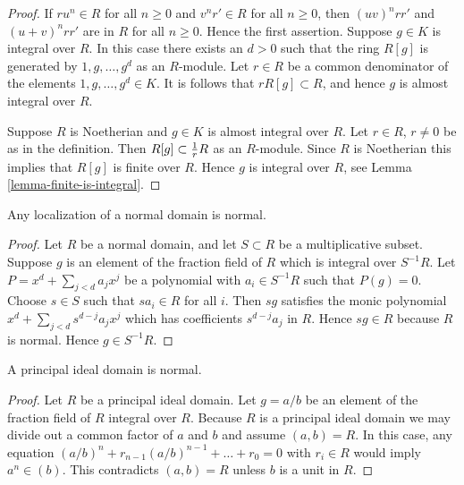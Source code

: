 \begin{proof}
If $ru^n \in R$ for all $n \geq 0$ and 
$v^nr' \in R$ for all $n \geq 0$, then
$(uv)^nrr'$ and $(u+v)^nrr'$ are in $R$ for
all $n \geq 0$. Hence the first assertion.
Suppose $g \in K$ is integral over $R$.
In this case there exists an $d > 0$ such that
the ring $R[g]$ is generated by $1,g,\ldots,g^d$ as an $R$-module.
Let $r \in R$ be a common denominator of the elements
$1,g,\ldots,g^d \in K$. It is follows that $rR[g] \subset R$,
and hence $g$ is almost integral over $R$.

\medskip\noindent
Suppose $R$ is Noetherian and $g \in K$ is almost integral over $R$.
Let $r \in R$, $r\not= 0$ be as in the definition. 
Then $R[g] \subset {1 \over r}R$ as an $R$-module.
Since $R$ is Noetherian this implies that $R[g]$ is
finite over $R$. Hence $g$ is integral over $R$, see
Lemma \ref{lemma-finite-is-integral}.
\end{proof}

\begin{lemma}
\label{lemma-localize-normal-domain}
Any localization of a normal domain is normal.
\end{lemma}

\begin{proof}
Let $R$ be a normal domain, and let $S \subset R$ be
a multiplicative subset. Suppose $g$ is an element
of the fraction field of $R$ which is integral over $S^{-1}R$.
Let $P = x^d + \sum_{j < d} a_j x^j$ be a polynomial
with $a_i \in S^{-1}R$ such that $P(g) = 0$.
Choose $s \in S$ such that $sa_i \in R$ for all $i$. 
Then $sg$ satisfies the monic polynomial
$x^d + \sum_{j < d} s^{d-j}a_j x^j$ which has coefficients
$s^{d-j}a_j$ in $R$. Hence $sg \in R$ because $R$ is normal.
Hence $g \in S^{-1}R$.
\end{proof}

\begin{lemma}
\label{lemma-PID-normal}
A principal ideal domain is normal.
\end{lemma}

\begin{proof}
Let $R$ be a principal ideal domain.
Let $g = a/b$ be an element of the fraction field
of $R$ integral over $R$. Because $R$ is a principal ideal domain
we may divide out a common factor of $a$ and $b$
and assume $(a,b) = R$. In this case, any equation
$(a/b)^n + r_{n-1} (a/b)^{n-1} + \ldots + r_0 = 0$
with $r_i \in R$ would imply $a^n \in (b)$. This
contradicts $(a,b) = R$ unless $b$ is a unit in $R$.
\end{proof}

